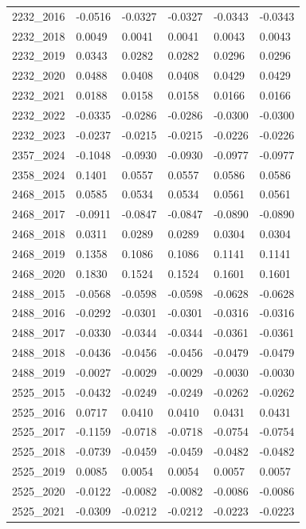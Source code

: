\begin{table}[htbp]
\begin{tabular}{llllll}
2232_2016 & -0.0516 & -0.0327 & -0.0327 & -0.0343 & -0.0343 \\
2232_2018 & 0.0049 & 0.0041 & 0.0041 & 0.0043 & 0.0043 \\
2232_2019 & 0.0343 & 0.0282 & 0.0282 & 0.0296 & 0.0296 \\
2232_2020 & 0.0488 & 0.0408 & 0.0408 & 0.0429 & 0.0429 \\
2232_2021 & 0.0188 & 0.0158 & 0.0158 & 0.0166 & 0.0166 \\
2232_2022 & -0.0335 & -0.0286 & -0.0286 & -0.0300 & -0.0300 \\
2232_2023 & -0.0237 & -0.0215 & -0.0215 & -0.0226 & -0.0226 \\
2357_2024 & -0.1048 & -0.0930 & -0.0930 & -0.0977 & -0.0977 \\
2358_2024 & 0.1401 & 0.0557 & 0.0557 & 0.0586 & 0.0586 \\
2468_2015 & 0.0585 & 0.0534 & 0.0534 & 0.0561 & 0.0561 \\
2468_2017 & -0.0911 & -0.0847 & -0.0847 & -0.0890 & -0.0890 \\
2468_2018 & 0.0311 & 0.0289 & 0.0289 & 0.0304 & 0.0304 \\
2468_2019 & 0.1358 & 0.1086 & 0.1086 & 0.1141 & 0.1141 \\
2468_2020 & 0.1830 & 0.1524 & 0.1524 & 0.1601 & 0.1601 \\
2488_2015 & -0.0568 & -0.0598 & -0.0598 & -0.0628 & -0.0628 \\
2488_2016 & -0.0292 & -0.0301 & -0.0301 & -0.0316 & -0.0316 \\
2488_2017 & -0.0330 & -0.0344 & -0.0344 & -0.0361 & -0.0361 \\
2488_2018 & -0.0436 & -0.0456 & -0.0456 & -0.0479 & -0.0479 \\
2488_2019 & -0.0027 & -0.0029 & -0.0029 & -0.0030 & -0.0030 \\
2525_2015 & -0.0432 & -0.0249 & -0.0249 & -0.0262 & -0.0262 \\
2525_2016 & 0.0717 & 0.0410 & 0.0410 & 0.0431 & 0.0431 \\
2525_2017 & -0.1159 & -0.0718 & -0.0718 & -0.0754 & -0.0754 \\
2525_2018 & -0.0739 & -0.0459 & -0.0459 & -0.0482 & -0.0482 \\
2525_2019 & 0.0085 & 0.0054 & 0.0054 & 0.0057 & 0.0057 \\
2525_2020 & -0.0122 & -0.0082 & -0.0082 & -0.0086 & -0.0086 \\
2525_2021 & -0.0309 & -0.0212 & -0.0212 & -0.0223 & -0.0223 \\

\end{tabular}
\end{table}
